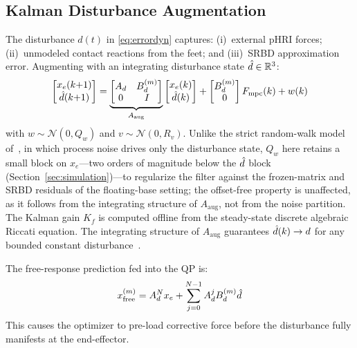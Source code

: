 \subsection{Kalman Disturbance Augmentation}

The disturbance $d(t)$ in \eqref{eq:errordyn} captures: (i)~external pHRI
forces; (ii)~unmodeled contact reactions from the feet; and (iii)~SRBD
approximation error.
Augmenting with an integrating disturbance state $\hat{d}\in\mathbb{R}^3$:
\begin{equation}\label{eq:augstate}
  \begin{bmatrix}x_e(k{+}1)\\\hat{d}(k{+}1)\end{bmatrix}
  =\underbrace{\begin{bmatrix}A_d & B_d^{(m)} \\ 0 & I\end{bmatrix}}_{A_{\text{aug}}}
  \begin{bmatrix}x_e(k)\\\hat{d}(k)\end{bmatrix}
  +\begin{bmatrix}B_d^{(m)}\\0\end{bmatrix}F_{\text{mpc}}(k)+w(k)
\end{equation}
with $w\sim\mathcal{N}(0,Q_w)$ and $v\sim\mathcal{N}(0,R_v)$.
Unlike the strict random-walk model of~\cite{cao2026impedance}, in which
process noise drives only the disturbance state, $Q_w$ here retains a
small block on $x_e$---two orders of magnitude below the $\hat{d}$
block (Section~\ref{sec:simulation})---to regularize the filter against
the frozen-matrix and SRBD residuals of the floating-base setting; the
offset-free property is unaffected, as it follows from the integrating
structure of $A_{\text{aug}}$, not from the noise partition.
The Kalman gain $K_f$ is computed offline from the steady-state discrete
algebraic Riccati equation.
The integrating structure of $A_{\text{aug}}$ guarantees $\hat{d}(k)\to d$
for any bounded constant disturbance~\cite{cao2004antiwindup}.

The free-response prediction fed into the QP is:
\begin{equation}\label{eq:freeresponse}
  x_{\text{free}}^{(m)} = A_d^N x_e + \sum_{j=0}^{N-1}A_d^j B_d^{(m)}\hat{d}
\end{equation}
This causes the optimizer to pre-load corrective force before the
disturbance fully manifests at the end-effector.


